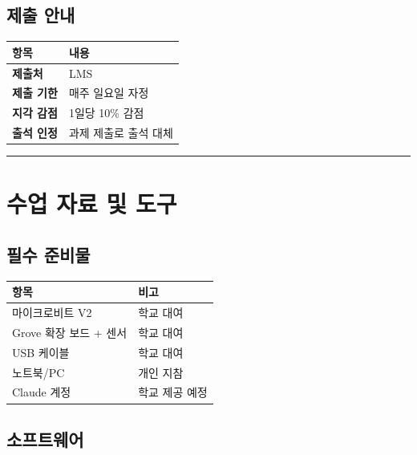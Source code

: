 \documentclass[11pt, a4paper]{article}
\begin{document}
\subsection{제출 안내}

\begin{table}[H]
\centering
\begin{tabular}{|L{3cm}|L{10.5cm}|}
\hline
{}
\textbf{항목} & \textbf{내용} \\
\hline
\textbf{제출처} & LMS \\
\hline
\textbf{제출 기한} & 매주 일요일 자정 \\
\hline
\textbf{지각 감점} & 1일당 10\% 감점 \\
\hline
\textbf{출석 인정} & 과제 제출로 출석 대체 \\
\hline
\end{tabular}
\end{table}

\vspace{3pt}
\noindent\rule{\textwidth}{0.3pt}

\section{수업 자료 및 도구}

\subsection{필수 준비물}

\begin{table}[H]
\centering
\begin{tabular}{|L{5cm}|L{8.5cm}|}
\hline
{}
\textbf{항목} & \textbf{비고} \\
\hline
마이크로비트 V2 & 학교 대여 \\
\hline
Grove 확장 보드 + 센서 & 학교 대여 \\
\hline
USB 케이블 & 학교 대여 \\
\hline
노트북/PC & 개인 지참 \\
\hline
Claude 계정 & 학교 제공 예정 \\
\hline
\end{tabular}
\end{table}

\subsection{소프트웨어}
\end{document}

